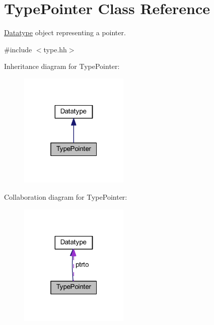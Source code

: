 \hypertarget{class_type_pointer}{}\section{Type\+Pointer Class Reference}
\label{class_type_pointer}


\mbox{\hyperlink{class_datatype}{Datatype}} object representing a pointer.  




{\ttfamily \#include $<$type.\+hh$>$}



Inheritance diagram for Type\+Pointer\+:
\nopagebreak
\begin{figure}[H]
\begin{center}
\leavevmode
\includegraphics[width=148pt]{class_type_pointer__inherit__graph}
\end{center}
\end{figure}


Collaboration diagram for Type\+Pointer\+:
\nopagebreak
\begin{figure}[H]
\begin{center}
\leavevmode
\includegraphics[width=148pt]{class_type_pointer__coll__graph}
\end{center}
\end{figure}
